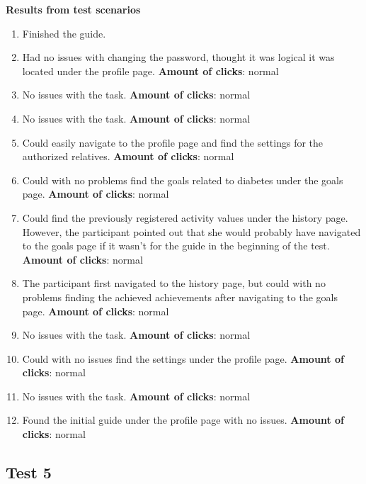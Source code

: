 \noindent\textbf{Results from test scenarios}
\begin{enumerate}
\item Finished the guide.
\item Had no issues with changing the password, thought it was logical it was located under the profile page.
\subitem \textbf{Amount of clicks}: normal
\item No issues with the task.
\subitem \textbf{Amount of clicks}: normal
\item No issues with the task.
\subitem \textbf{Amount of clicks}: normal
\item Could easily navigate to the profile page and find the settings for the authorized relatives. 
\subitem \textbf{Amount of clicks}: normal
\item Could with no problems find the goals related to diabetes under the goals page.
\subitem \textbf{Amount of clicks}: normal
\item Could find the previously registered activity values under the history page. However, the participant pointed out that she would probably have navigated to the goals page if it wasn’t for the guide in the beginning of the test.
\subitem \textbf{Amount of clicks}: normal
\item The participant first navigated to the history page, but could with no problems finding the achieved achievements after navigating to the goals page. 
\subitem \textbf{Amount of clicks}: normal
\item No issues with the task.
\subitem \textbf{Amount of clicks}: normal
\item Could with no issues find the settings under the profile page. 
\subitem \textbf{Amount of clicks}: normal
\item No issues with the task. 
\subitem \textbf{Amount of clicks}: normal
\item Found the initial guide under the profile page with no issues.
\subitem \textbf{Amount of clicks}: normal
\end{enumerate}


\subsection{Test 5}

